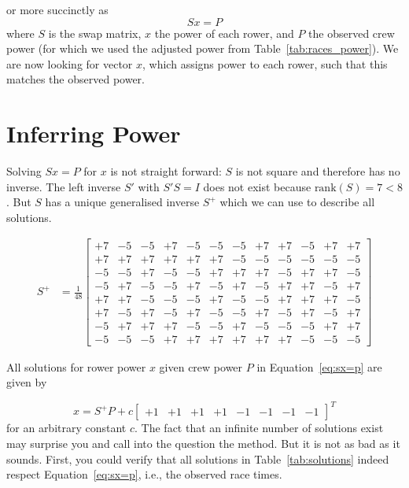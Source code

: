 \documentclass[a4paper,11pt]{article}
\begin{document}
%
or more succinctly as
%
\begin{equation}
\label{eq:sx=p}
S x = P
\end{equation}
%
where $S$ is the swap matrix, $x$ the power of each rower, and $P$ the
observed crew power (for which we used the adjusted power from
Table~\ref{tab:races_power}).  We are now looking for vector $x$, which
assigns power to each rower, such that this matches the observed power.

\section{Inferring Power}

Solving $Sx=P$ for $x$ is not straight forward: $S$ is not square and
therefore has no inverse.  The left inverse $S'$ with $S'S=I$ does not
exist because $\textrm{rank}(S)= 7 < 8$. But $S$ has a unique
generalised inverse $S^+$ which we can use to describe all solutions.

\begin{align}
  S^+ &= \frac{1}{48}
  \begin{bmatrix}
  +7&-5&-5&+7&-5&-5&-5&+7&+7&-5&+7&+7\\
  +7&+7&+7&+7&+7&+7&-5&-5&-5&-5&-5&-5\\
  -5&-5&+7&-5&-5&+7&+7&+7&-5&+7&+7&-5\\
  -5&+7&-5&-5&+7&-5&+7&-5&+7&+7&-5&+7\\
  +7&+7&-5&-5&-5&+7&-5&-5&+7&+7&+7&-5\\
  +7&-5&+7&-5&+7&-5&-5&+7&-5&+7&-5&+7\\
  -5&+7&+7&+7&-5&-5&+7&-5&-5&-5&+7&+7\\
  -5&-5&-5&+7&+7&+7&+7&+7&+7&-5&-5&-5
  \end{bmatrix}
\end{align}


All solutions for rower power $x$ given crew power $P$ in
Equation~\ref{eq:sx=p} are given by

\begin{equation}
  \label{eq:x=sp}
  x = S^+ P + c 
  \begin{bmatrix}
    +1&+1&+1&+1&-1&-1&-1&-1
  \end{bmatrix}^T
\end{equation}
%
for an arbitrary constant $c$. The fact that an infinite number of
solutions exist may surprise you and call into the question the method.
But it is not as bad as it sounds. First, you could verify that all
solutions in Table~\ref{tab:solutions} indeed respect
Equation~\ref{eq:sx=p}, i.e., the observed race times.
\end{document}
